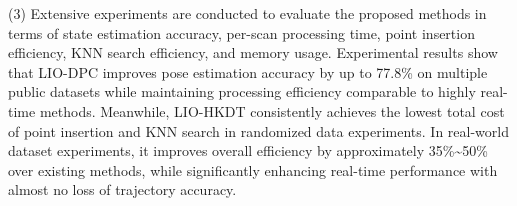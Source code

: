 \begin{eabstract}
(3) Extensive experiments are conducted to evaluate the proposed methods in terms of state estimation accuracy, per-scan processing time, point insertion efficiency, KNN search efficiency, and memory usage. Experimental results show that LIO-DPC improves pose estimation accuracy by up to 77.8\% on multiple public datasets while maintaining processing efficiency comparable to highly real-time methods. Meanwhile, LIO-HKDT consistently achieves the lowest total cost of point insertion and KNN search in randomized data experiments. In real-world dataset experiments, it improves overall efficiency by approximately 35\%\textasciitilde50\% over existing methods, while significantly enhancing real-time performance with almost no loss of trajectory accuracy.

\end{eabstract}


\makeabstract